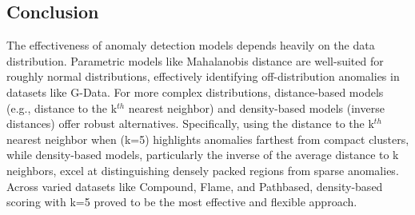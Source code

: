 \documentclass{article}
\begin{document}
\subsection{Conclusion}
The effectiveness of anomaly detection models depends heavily on the data distribution.
Parametric models like Mahalanobis distance are well-suited for roughly normal distributions,
effectively identifying off-distribution anomalies in datasets like G-Data. For more complex
distributions, distance-based models (e.g., distance to the k$^{th}$ nearest neighbor) and
density-based models (inverse distances) offer robust alternatives. Specifically, using the
distance to the k$^{th}$ nearest neighbor when (k=5) highlights anomalies farthest from
compact clusters, while density-based models, particularly the inverse of the average
distance to k neighbors, excel at distinguishing densely packed regions from sparse
anomalies. Across varied datasets like Compound, Flame, and Pathbased, density-based
scoring with k=5 proved to be the most effective and flexible approach.
\end{document}
